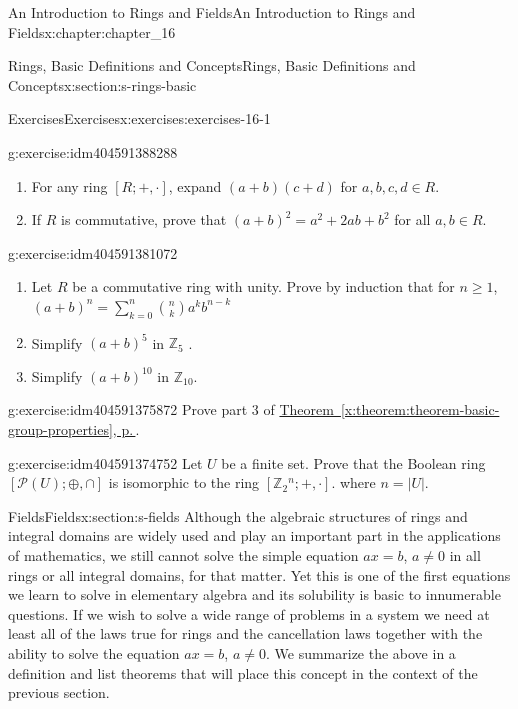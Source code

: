 \documentclass[twoside,10pt,]{book}
\newcommand{\xreffont}{\relax}
\numberwithin{equation}{section}
\begin{document}
\begin{chapterptx}{An Introduction to Rings and Fields}{}{An Introduction to Rings and Fields}{}{}{x:chapter:chapter_16}
\begin{sectionptx}{Rings, Basic Definitions and Concepts}{}{Rings, Basic Definitions and Concepts}{}{}{x:section:s-rings-basic}
\begin{exercises-subsection}{Exercises}{}{Exercises}{}{}{x:exercises:exercises-16-1}
\begin{divisionexercise}{13}{}{}{g:exercise:idm404591388288}
\begin{enumerate}[label=(\alph*)]
\item{}For any ring \([R; +, \cdot ]\), expand \((a + b)(c + d)\) for \(a, b, c, d \in R\).%
\item{}If \(R\) is commutative, prove that \((a + b)^2 = a^2 + 2a b + b^2\)  for all \(a, b \in  R\).%
\end{enumerate}
%
\end{divisionexercise}%
\begin{divisionexercise}{14}{}{}{g:exercise:idm404591381072}%
%
\begin{enumerate}[label=(\alph*)]
\item{}Let \(R\) be a commutative ring with unity. Prove by induction that for \(n \geq  1\), \((a+b)^n= \sum _{k=0}^n  \binom{n}{k}a^k b^{n-k}\)%
\item{}Simplify \((a + b)^5\) in \(\mathbb{Z}_5\) .%
\item{}Simplify \((a + b)^{10}\) in \(\mathbb{Z}_{10}\).%
\end{enumerate}
%
\end{divisionexercise}%
\begin{divisionexercise}{15}{}{}{g:exercise:idm404591375872}%
Prove part 3 of \hyperref[x:theorem:theorem-basic-group-properties]{Theorem~{\xreffont\ref{x:theorem:theorem-basic-group-properties}}, p.\,\pageref{x:theorem:theorem-basic-group-properties}}.%
\end{divisionexercise}%
\begin{divisionexercise}{16}{}{}{g:exercise:idm404591374752}%
Let \(U\) be a finite set. Prove that the Boolean ring \([\mathcal{P}(U);\oplus ,\cap ]\) is isomorphic to the ring \(\left[\mathbb{Z}_2{}^n; +, \cdot \right]\). where \(n =\left| U\right|\).%
\end{divisionexercise}%
\end{exercises-subsection}
\end{sectionptx}
%
%
\typeout{************************************************}
\typeout{************************************************}
%
\begin{sectionptx}{Fields}{}{Fields}{}{}{x:section:s-fields}
Although the algebraic structures of rings and integral domains are widely used and play an important part in the applications of mathematics, we still cannot solve the simple equation \(a x = b\), \(a \neq  0\) in all rings or  all integral domains, for that matter. Yet this is one of the first equations we learn to solve in elementary algebra and its solubility is basic to innumerable questions. If we wish to solve a wide range of problems in a system we need at least all of the laws true for rings and the cancellation laws together with the ability to solve the equation \(a x = b\), \(a \neq  0\). We summarize the above in a definition and list theorems  that will place this concept in the context of the previous section.%

\end{sectionptx}
\end{chapterptx}
\end{document}
